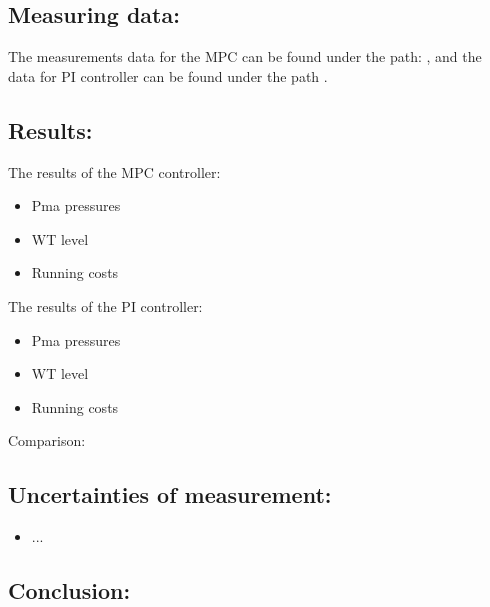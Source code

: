 \subsection*{Measuring data:}
The measurements data for the MPC can be found under the path: , and the data for PI controller can be found under the path . 

\subsection*{Results:}
The results of the MPC controller:
\begin{itemize}
	\item Pma pressures
	\item WT level
	\item Running costs
\end{itemize}	

The results of the PI controller:
\begin{itemize}
	\item Pma pressures
	\item WT level
	\item Running costs
\end{itemize}	

Comparison:

\subsection*{Uncertainties of measurement:}
\begin{itemize}
\item ...
\end{itemize}

\subsection*{Conclusion:}
